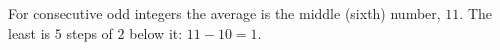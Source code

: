 For consecutive odd integers the average is the middle (sixth) number, $11$. The least is $5$ steps of $2$ below it: $11-10=\boxed{1}$.
